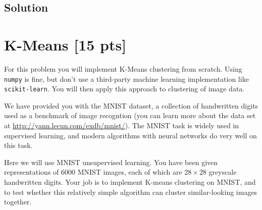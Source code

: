 \documentclass[submit]{harvardml}
\begin{document}
\subsection*{Solution}




\newpage

\section*{K-Means [15 pts]}

For this problem you will implement  K-Means clustering from scratch. Using \texttt{numpy} is fine, but don't use a
third-party machine learning implementation like \texttt{scikit-learn}. You will then apply this approach to clustering of image data.  



We have provided you with the MNIST dataset, a collection of handwritten digits used as a benchmark of image recogntion (you  can
learn more about the data set at  \url{http://yann.lecun.com/exdb/mnist/}). The MNIST task
is widely used in supervised learning, and modern algorithms with neural
networks do very well on this task. 

Here we will use MNIST unsupervised learning. You have been given
representations of 6000 MNIST images, each of which are $28\times28$
greyscale handwritten digits. Your job is to implement K-means
clustering on MNIST, and to test whether this relatively simple algorithm can
cluster similar-looking images together.

~
\end{document}
